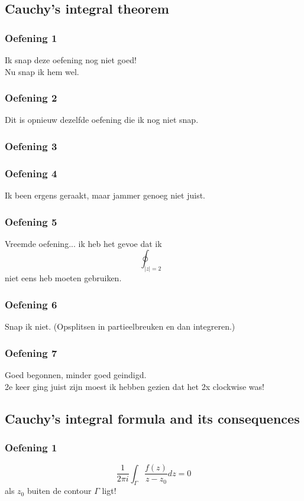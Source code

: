 \documentclass[a4paper,twoside]{article}
\theoremstyle{definition}
\theoremstyle{plain}
\begin{document}
\subsection{Cauchy's integral theorem}
\subsubsection{Oefening 1}
Ik snap deze oefening nog niet goed!\\
Nu snap ik hem wel.
\subsubsection{Oefening 2}
Dit is opnieuw dezelfde oefening die ik nog niet snap.
\subsubsection{Oefening 3}

\subsubsection{Oefening 4}
Ik been ergens geraakt, maar jammer genoeg niet juist.
\subsubsection{Oefening 5}
Vreemde oefening... ik heb het gevoe dat ik \[\oint_{|z|=2}\] niet eens heb moeten gebruiken.
\subsubsection{Oefening 6}
Snap ik niet. (Opsplitsen in partieelbreuken en dan integreren.)

\subsubsection{Oefening 7}
Goed begonnen, minder goed geindigd.\\
2e keer ging juist zijn moest ik hebben gezien dat het 2x clockwise was!
\subsection{Cauchy's integral formula and its consequences}
\subsubsection{Oefening 1}
\[
\frac{1}{2\pi i} \int_\Gamma \frac{f(z)}{z-z_0} dz = 0
\] als \(z_0\) buiten de contour \(\Gamma\) ligt!\\
\end{document}
